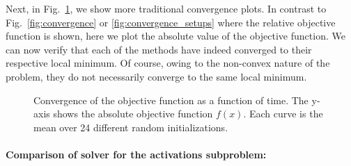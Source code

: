 Next, in Fig.~\ref{fig:convergence_traditional}, we show more traditional convergence plots. In contrast to Fig.~\ref{fig:convergence} or \ref{fig:convergence_setups} where the relative objective function is shown, here we plot the absolute value of the objective function. We can now verify that each of the methods have indeed converged to their respective local minimum. Of course, owing to the non-convex nature of the problem, they do not necessarily converge to the same local minimum.
\begin{figure}[htb]
    \centering
    \caption[Convergence of the objective function as a function of time.]{Convergence of the objective function as a function of time. The y-axis shows the absolute objective function $f(x)$. Each curve is the mean over 24 different random initializations.}
    \label{fig:convergence_traditional}
\end{figure}

\paragraph{Comparison of solver for the activations subproblem:}

